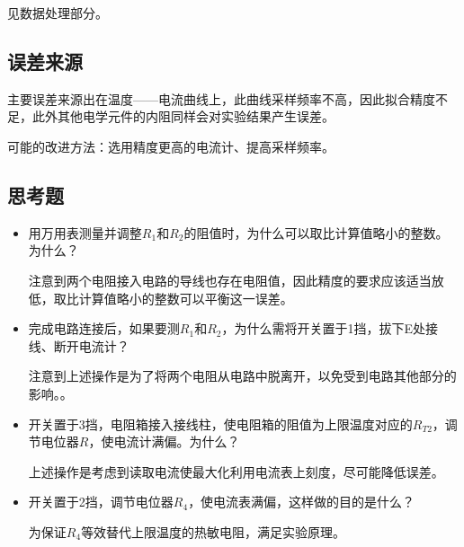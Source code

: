 \documentclass[a4paper]{ltxdoc}
\begin{document}
\begin{multicols}{2}
    见数据处理部分。

    \subsection{误差来源}

    主要误差来源出在温度——电流曲线上，此曲线采样频率不高，因此拟合精度不足，此外其他电学元件的内阻同样会对实验结果产生误差。

    可能的改进方法：选用精度更高的电流计、提高采样频率。

    \subsection{思考题}

    \begin{itemize}
        \item  用万用表测量并调整$R_1$和$R_2$的阻值时，为什么可以取比计算值略小的整数。为什么？

              注意到两个电阻接入电路的导线也存在电阻值，因此精度的要求应该适当放低，取比计算值略小的整数可以平衡这一误差。

        \item 完成电路连接后，如果要测$R_1$和$R_2$，为什么需将开关置于1挡，拔下E处接线、断开电流计？

              注意到上述操作是为了将两个电阻从电路中脱离开，以免受到电路其他部分的影响。。

        \item  开关置于3挡，电阻箱接入接线柱，使电阻箱的阻值为上限温度对应的$R_{T2}$，调节电位器$R$，使电流计满偏。为什么？

              上述操作是考虑到读取电流使最大化利用电流表上刻度，尽可能降低误差。

        \item 开关置于2挡，调节电位器$R_4$，使电流表满偏，这样做的目的是什么？

              为保证$R_4$等效替代上限温度的热敏电阻，满足实验原理。
    \end{itemize}
\end{multicols}
\end{document}
